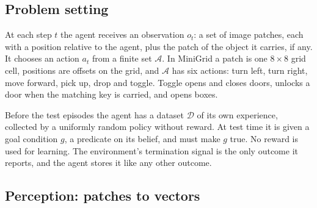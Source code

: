 \documentclass{article}
\begin{document}
\subsection{Problem setting}

At each step $t$ the agent receives an observation $o_t$: a set of image patches, each with a position relative to the agent, plus the patch of the object it carries, if any. It chooses an action $a_t$ from a finite set $\mathcal{A}$. In MiniGrid a patch is one $8\times8$ grid cell, positions are offsets on the grid, and $\mathcal{A}$ has six actions: turn left, turn right, move forward, pick up, drop and toggle. Toggle opens and closes doors, unlocks a door when the matching key is carried, and opens boxes.

Before the test episodes the agent has a dataset $\mathcal{D}$ of its own experience, collected by a uniformly random policy without reward. At test time it is given a goal condition $g$, a predicate on its belief, and must make $g$ true. No reward is used for learning. The environment's termination signal is the only outcome it reports, and the agent stores it like any other outcome.

\subsection{Perception: patches to vectors}
\label{sec:encoder}
\end{document}
